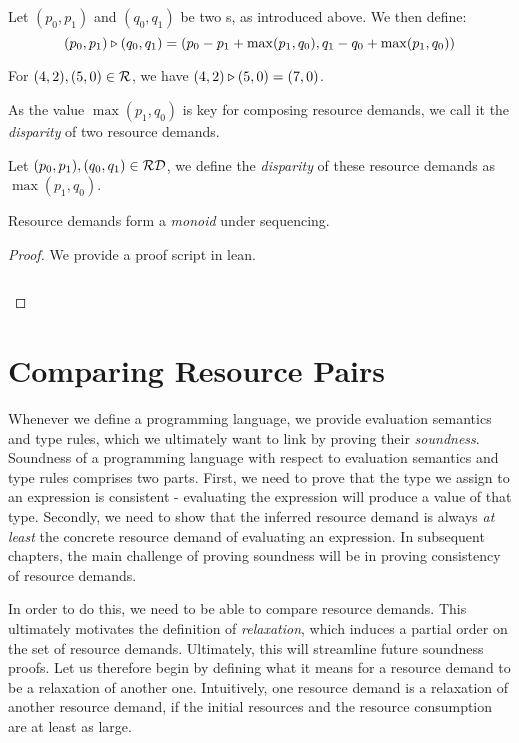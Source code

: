 \begin{definition}
   \label{def:multiplying-pairs}
   Let \((p_0, p_1)\) and \((q_0, q_1)\) be two s, as introduced above. We then define:
   \[(p_0, p_1) \triangleright (q_0, q_1) = (p_0 - p_1 + \max(p_1, q_0), q_1 - q_0 + \max(p_1, q_0))\]
\end{definition}

\begin{example}
   For \((4, 2), (5,0) \in \mathcal{R}\), we have \((4, 2) \triangleright (5, 0) = (7,0)\).
\end{example}
 
As the value \(\max(p_1, q_0)\) is key for composing resource demands, we call it the \emph{disparity} of two resource demands.

\begin{definition}
   \label{def:resource-disparity}
   Let \((p_0, p_1), (q_0, q_1) \in \mathcal{RD}\), we define the \emph{disparity} of these resource demands as \(\max(p_1, q_0)\).
\end{definition}

\begin{theorem}
   Resource demands form a \emph{monoid} under sequencing.
\end{theorem}

\begin{proof}
   We provide a proof script in lean.
   \inputminted{lean}{formal-proofs/Resources/Monoid.lean}
\end{proof}


\section{Comparing Resource Pairs}

Whenever we define a programming language, we provide evaluation semantics and type rules, which we ultimately want to link by proving their \emph{soundness}. Soundness of a programming language with respect to evaluation semantics and type rules comprises two parts. First, we need to prove that the type we assign to an expression is consistent - evaluating the expression will produce a value of that type. Secondly, we need to show that the inferred resource demand is always \emph{at least} the concrete resource demand of evaluating an expression. In subsequent chapters, the main challenge of proving soundness will be in proving consistency of resource demands. 

In order to do this, we need to be able to compare resource demands. This ultimately motivates the definition of \emph{relaxation}, which induces a partial order on the set of resource demands. Ultimately, this will streamline future soundness proofs. Let us therefore begin by defining what it means for a resource demand to be a relaxation of another one. Intuitively, one resource demand is a relaxation of another resource demand, if the initial resources and the resource consumption are at least as large.

